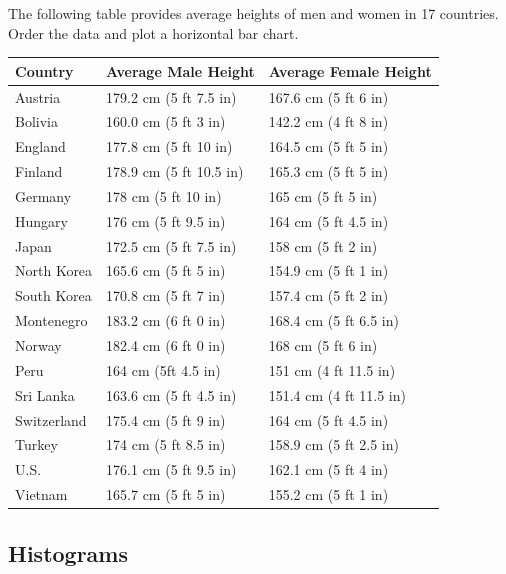 \begin{problem}

The following table provides average heights of men and women in 17 countries. Order the data and plot a horizontal bar chart. 


\begin{tabular}{ | l || l | l | }
\hline
Country & Average Male Height & Average Female Height \\
\hline
Austria & 179.2 cm (5 ft 7.5 in) & 167.6 cm (5 ft 6 in) \\
Bolivia & 160.0 cm (5 ft 3 in) & 142.2 cm (4 ft 8 in) \\
England & 177.8 cm (5 ft 10 in) & 164.5 cm (5 ft 5 in) \\
Finland & 178.9 cm (5 ft 10.5 in) & 165.3 cm (5 ft 5 in) \\
Germany & 178 cm (5 ft 10 in) & 165 cm (5 ft 5 in) \\
Hungary & 176 cm (5 ft 9.5 in) & 164 cm (5 ft 4.5 in) \\
Japan & 172.5 cm (5 ft 7.5 in) & 158 cm (5 ft 2 in) \\
North Korea & 165.6 cm (5 ft 5 in) & 154.9 cm (5 ft 1 in) \\
South Korea & 170.8 cm (5 ft 7 in) & 157.4 cm (5 ft 2 in) \\
Montenegro & 183.2 cm (6 ft 0 in) & 168.4 cm (5 ft 6.5 in) \\
Norway & 182.4 cm (6 ft 0 in) & 168 cm (5 ft 6 in) \\
Peru & 164 cm (5ft 4.5 in) & 151 cm (4 ft 11.5 in) \\
Sri Lanka & 163.6 cm (5 ft 4.5 in) & 151.4 cm (4 ft 11.5 in) \\
Switzerland & 175.4 cm (5 ft 9 in) & 164 cm (5 ft 4.5 in) \\
Turkey & 174 cm (5 ft 8.5 in) & 158.9 cm (5 ft 2.5 in) \\
U.S. & 176.1 cm (5 ft 9.5 in) & 162.1 cm (5 ft 4 in) \\
Vietnam & 165.7 cm (5 ft 5 in) & 155.2 cm (5 ft 1 in) \\
\hline
\end{tabular}
\label{prob1}
\end{problem}





\subsection*{Histograms}


